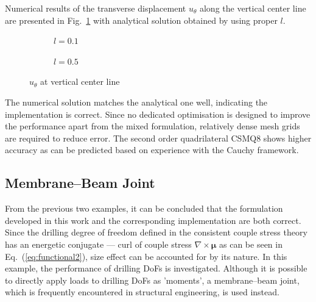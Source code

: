 \documentclass[3p,sort&compress,11pt,fleqn]{elsarticle}
\newcommand*{\figref}[1]{Fig.~\ref{#1}}
\newcommand*{\eqsref}[1]{Eq.~(\ref{#1})}
\begin{document}
Numerical results of the transverse displacement $u_\theta$ along the vertical center line are presented in \figref{fig:u_theta} with analytical solution obtained by using proper $l$.
\begin{figure}[htb]
\centering\footnotesize
\begin{subfigure}[b]{.49\textwidth}\centering

\caption{$l=\num{0.1}$}
\end{subfigure}\hfill
\begin{subfigure}[b]{.49\textwidth}\centering

\caption{$l=\num{0.5}$}
\end{subfigure}
\caption{$u_\theta$ at vertical center line}\label{fig:u_theta}
\end{figure}
The numerical solution matches the analytical one well, indicating the implementation is correct. Since no dedicated optimisation is designed to improve the performance apart from the mixed formulation, relatively dense mesh grids are required to reduce error. The second order quadrilateral CSMQ8 shows higher accuracy as can be predicted based on experience with the Cauchy framework.
\subsection{Membrane--Beam Joint}
From the previous two examples, it can be concluded that the formulation developed in this work and the corresponding implementation are both correct. Since the drilling degree of freedom defined in the consistent couple stress theory has an energetic conjugate --- curl of couple stress $\nabla\times\mathbold{\mu}$ as can be seen in \eqsref{eq:functional2}, size effect can be accounted for by its nature. In this example, the performance of drilling DoFs is investigated. Although it is possible to directly apply loads to drilling DoFs as 'moments', a membrane--beam joint, which is frequently encountered in structural engineering, is used instead.
\end{document}
